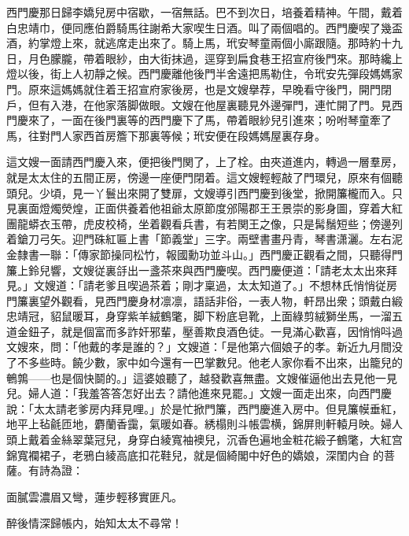 西門慶那日歸李嬌兒房中宿歇，一宿無話。巴不到次日，培養着精神。午間，戴着白忠靖巾，便同應伯爵騎馬往謝希大家喫生日酒。叫了兩個唱的。西門慶喫了幾盃酒，約掌燈上來，就逃席走出來了。騎上馬，玳安琴童兩個小廝跟隨。那時約十九日，月色朦朧，帶着眼紗，由大街抹過，逕穿到扁食巷王招宣府後門來。那時纔上燈以後，街上人初靜之候。西門慶離他後門半舍遠把馬勒住，令玳安先彈段媽媽家門。原來這媽媽就住着王招宣府家後房，也是文嫂擧荐，早晚看守後門，開門閉戶，但有入港，在他家落脚做眼。文嫂在他屋裏聽見外邊彈門，連忙開了門。見西門慶來了，一面在後門裏等的西門慶下了馬，帶着眼紗兒引進來；吩咐琴童牽了馬，往對門人家西首房簷下那裏等候；玳安便在段媽媽屋裏存身。

這文嫂一面請西門慶入來，便把後門関了，上了栓。由夾道進内，轉過一層羣房，就是太太住的五間正房，傍邊一座便門閉着。這文嫂輕輕敲了門環兒，原來有個聽頭兒。少頃，見一丫鬟出來開了雙扉，文嫂導引西門慶到後堂，掀開簾櫳而入。只見裏面燈燭熒煌，正面供養着他祖爺太原節度邠陽郡王王景崇的影身圖，穿着大紅團龍蟒衣玉帶，虎皮校椅，坐着觀看兵書，有若関王之像，只是髯鬚短些；傍邊列着鎗刀弓矢。迎門硃紅匾上書「節義堂」三字。兩壁書畫丹青，琴書潇灑。左右泥金隸書一聯：「傳家節操同松竹，報國勳功並斗山。」西門慶正觀看之間，只聽得門簾上鈴兒響，文嫂従裏㧱出一盞茶來與西門慶喫。西門慶便道：「請老太太出來拜見。」文嫂道：「請老爹且喫過茶着；剛才稟過，太太知道了。」不想林氏悄悄従房門簾裏望外觀看，見西門慶身材凛凛，語話非俗，一表人物，軒昂出衆；頭戴白緞忠靖冠，貂鼠暖耳，身穿紫羊絨鶴氅，脚下粉底皂靴，上面綠剪絨獅坐馬，一溜五道金鈕子，就是個富而多詐奸邪輩，壓善欺良酒色徒。一見滿心歡喜，因悄悄呌過文嫂來，問：「他戴的孝是誰的？」文嫂道：「是他第六個娘子的孝。新近九月間没了不多些時。饒少數，家中如今還有一巴掌數兒。他老人家你看不出來，出籠兒的鵪鶉——也是個快鬬的。」這婆娘聽了，越發歡喜無盡。文嫂催逼他出去見他一見兒。婦人道：「我羞答答怎好出去？請他進來見罷。」文嫂一面走出來，向西門慶說：「太太請老爹房内拜見哩。」於是忙掀門簾，西門慶進入房中。但見簾幙垂紅，地平上毡毹匝地，麝蘭香靄，氣暖如春。綉榻則斗帳雲横，錦屏則軒轅月映。婦人頭上戴着金絲翠葉冠兒，身穿白綾寬袖襖兒，沉香色遍地金粧花緞子鶴氅，大紅宫錦寬襴裙子，老鴉白綾高底扣花鞋兒，就是個綺閣中好色的嬌娘，深閨内㒲𣭈的菩薩。有詩為證：

\begin{myquote}
面膩雲濃眉又彎，蓮步輕移實匪凡。

醉後情深歸帳内，始知太太不尋常！
\end{myquote}

